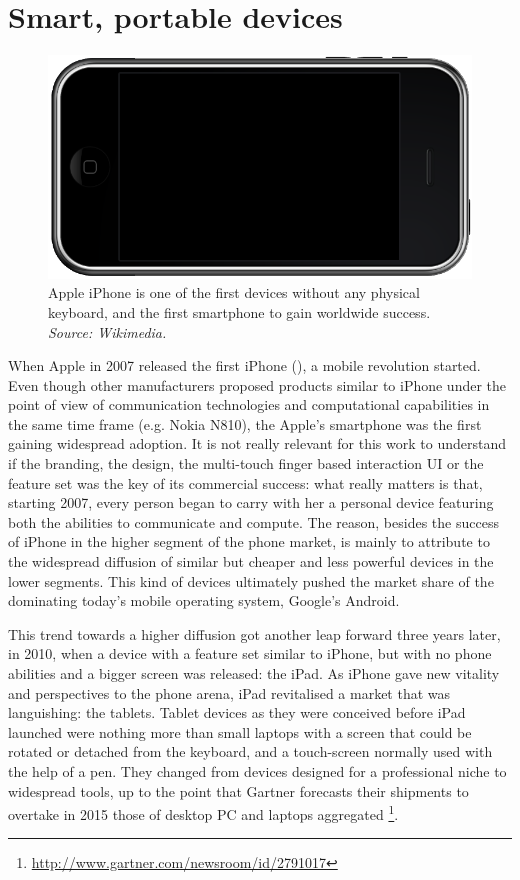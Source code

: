 \documentclass[12pt,a4paper,twoside,openright]{book}
\begin{document}
\section{Smart, portable devices}

\begin{figure}
	\centering
	\includegraphics[width=\textwidth]{img/iphone}
	\caption[Apple iPhone]{Apple iPhone is one of the first devices without any physical keyboard, and the first smartphone to gain worldwide success. \emph{Source: Wikimedia.}}
	\label{img:iphone}
\end{figure}

When Apple in 2007 released the first iPhone (), a mobile revolution started.
%
Even though other manufacturers proposed products similar to iPhone under the point of view of communication technologies and computational capabilities in the same time frame (e.g. Nokia N810), the Apple's smartphone was the first gaining widespread adoption.
%
It is not really relevant for this work to understand if the branding, the design, the multi-touch finger based interaction UI or the feature set was the key of its commercial success: what really matters is that, starting 2007, every person began to carry with her a personal device featuring both the abilities to communicate and compute.
%
The reason, besides the success of iPhone in the higher segment of the phone market, is mainly to attribute to the widespread diffusion of similar but cheaper and less powerful devices in the lower segments.
%
This kind of devices ultimately pushed the market share of the dominating today's mobile operating system, Google's Android.

This trend towards a higher diffusion got another leap forward three years later, in 2010, when a device with a feature set similar to iPhone, but with no phone abilities  and a bigger screen was released: the iPad.
%
As iPhone gave new vitality and perspectives to the phone arena, iPad revitalised a market that was languishing: the tablets.
%
Tablet devices as they were conceived before iPad launched were nothing more than small laptops with a screen that could be rotated or detached from the keyboard, and a touch-screen normally used with the help of a pen.
%
They changed from devices designed for a professional niche to widespread tools, up to the point that Gartner forecasts their shipments to overtake in 2015 those of desktop PC and laptops aggregated \footnote{\url{http://www.gartner.com/newsroom/id/2791017}}.
\end{document}
